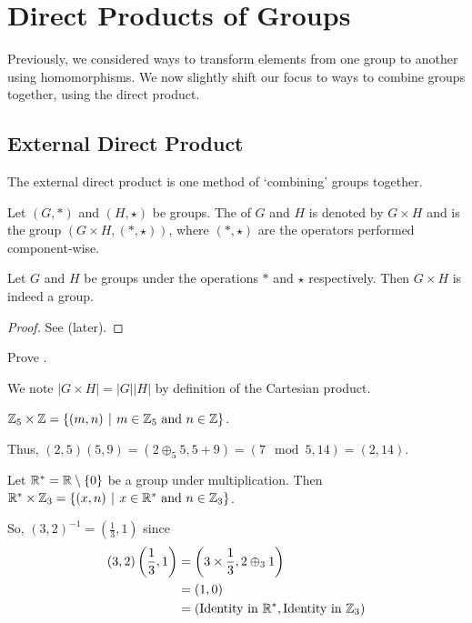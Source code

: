 \chapter{Direct Products of Groups}
Previously, we considered ways to transform elements from one group to another using homomorphisms. We now slightly shift our focus to ways to combine groups together, using the direct product.

\section{External Direct Product}
The external direct product is one method of `combining' groups together.
\begin{definition}
    Let $(G, \ast)$ and $(H, \star)$ be groups. The  of $G$ and $H$ is denoted by $G\times H$ and is the group $(G\times H, (\ast, \star))$, where $(\ast, \star)$ are the operators performed component-wise.
\end{definition}

\begin{proposition}\label{prop-external-direct-product-is-group}
    Let $G$ and $H$ be groups under the operations $\ast$ and $\star$ respectively. Then $G \times H$ is indeed a group.
\end{proposition}
\begin{proof}
    See  (later).
\end{proof}
\begin{exercise}\label{exercise-external-direct-product-is-group}
    Prove .
\end{exercise}

We note $|G \times H| = |G||H|$ by definition of the Cartesian product.

\begin{example}
    $\Z_5 \times \Z = \{(m,n) \vert m \in \Z_5 \text{ and } n \in \Z\}$.

    Thus, $(2, 5)(5, 9) = (2 \oplus_5 5, 5 + 9) = (7 \mod 5, 14) = (2, 14)$.
\end{example}

\begin{example}
    Let $\mathbb{R}^\ast = \mathbb{R}\setminus\{0\}$ be a group under multiplication. Then $\R^\ast \times \Z_3 = \{ (x, n) \vert x \in \R^\ast \text{ and } n \in \Z_3\}$.

    So, $(3, 2)^{-1} = \left(\frac13, 1\right)$ since
    \begin{align*}
        (3, 2)\left(\frac13, 1\right) &= \left(3 \times \frac13, 2 \oplus_3 1\right)\\
        &= (1, 0)\\
        &= (\text{Identity in }\mathbb{R}^\ast, \text{Identity in }\mathbb{Z}_3)
    \end{align*}
\end{example}


